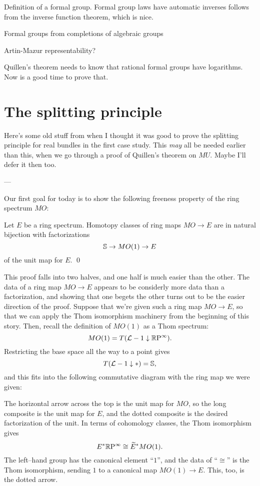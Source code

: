 Definition of a formal group.  Formal group laws have automatic inverses follows from the inverse function theorem, which is nice.

Formal groups from completions of algebraic groups

Artin-Mazur representability?

Quillen's theorem needs to know that rational formal groups have logarithms.  Now is a good time to prove that.





\section{The splitting principle}

Here's some old stuff from when I thought it was good to prove the splitting principle for real bundles in the first case study.  This \emph{may} all be needed earlier than this, when we go through a proof of Quillen's theorem on $MU$.  Maybe I'll defer it then too.

---

Our first goal for today is to show the following freeness property of the ring spectrum $MO$:
\begin{theorem}
Let $E$ be a ring spectrum.  Homotopy classes of ring maps $MO \to E$ are in natural bijection with factorizations \[\S \to MO(1) \to E\] of the unit map for $E$. \qed
\end{theorem}

\noindent This proof falls into two halves, and one half is much easier than the other.  The data of a ring map $MO \to E$ appears to be considerly more data than a factorization, and showing that one begets the other turns out to be the easier direction of the proof.  Suppose that we're given such a ring map $MO \to E$, so that we can apply the Thom isomorphism machinery from the beginning of this story.  Then, recall the definition of $MO(1)$ as a Thom spectrum: \[MO(1) = T(\L - 1 \downarrow \RP^\infty).\]  Restricting the base space all the way to a point gives \[T(\L - 1 \downarrow *) = \S,\] and this fits into the following commutative diagram with the ring map we were given:
\begin{center}
\end{center}
The horizontal arrow across the top is the unit map for $MO$, so the long composite is the unit map for $E$, and the dotted composite is the desired factorization of the unit.  In terms of cohomology classes, the Thom isomorphism gives \[E^* \RP^\infty \cong \widetilde E^* MO(1).\]  The left--hand group has the canonical element ``$1$'', and the data of ``$\cong$'' is the Thom isomorphism, sending $1$ to a canonical map $MO(1) \to E$.  This, too, is the dotted arrow.

